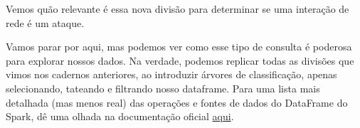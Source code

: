 \documentclass[11pt]{article}
\begin{document}
    Vemos quão relevante é essa nova divisão para determinar se uma
interação de rede é um ataque.

    Vamos parar por aqui, mas podemos ver como esse tipo de consulta é
poderosa para explorar nossos dados. Na verdade, podemos replicar todas
as divisões que vimos nos cadernos anteriores, ao introduzir árvores de
classificação, apenas selecionando, tateando e filtrando nosso
dataframe. Para uma lista mais detalhada (mas menos real) das operações
e fontes de dados do DataFrame do Spark, dê uma olhada na documentação
oficial
\href{https://spark.apache.org/docs/latest/sql-programming-guide.html\#dataframe-operations}{aqui}.


    
    
    
    
\end{document}
